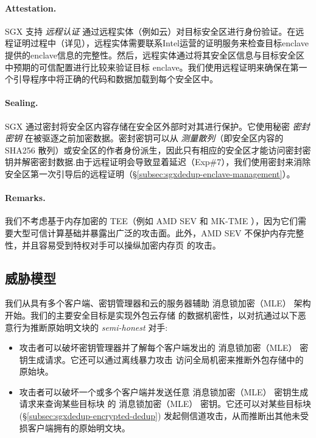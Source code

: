 \paragraph*{Attestation.} SGX 支持 \textit{ 远程认证} 通过远程实体（例如云）对目标安全区进行身份验证。在远程证明过程中（详见\cite{sgx}），远程实体需要联系Intel运营的证明服务来检查目标enclave提供的enclave信息的完整性。然后，远程实体通过将其安全区信息与目标安全区中预期的可信配置进行比较来验证目标 enclave。我们使用远程证明来确保在第一个引导程序中将正确的代码和数据加载到每个安全区中。

\paragraph*{Sealing.} SGX 通过密封将安全区内容存储在安全区外部时对其进行保护。它使用秘密 \textit{ 密封密钥} 在被驱逐之前加密数据。密封密钥可以从 \textit{ 测量散列}（即安全区内容的 SHA256 散列）或安全区的作者身份派生，因此只有相应的安全区才能访问密封密钥并解密密封数据.由于远程证明会导致显着延迟（Exp\#7），我们使用密封来消除安全区第一次引导后的远程证明（\S\ref{subsec:sgxdedup-enclave-management}）。

\paragraph*{Remarks.} 我们不考虑基于内存加密的 TEE（例如 AMD SEV \cite{Amdsev} 和 MK-TME \cite{Mktem}），因为它们需要大型可信计算基础并暴露出广泛的攻击面\cite{mofrad18}。此外，AMD SEV \cite{Amdsev} 不保护内存完整性，并且容易受到特权对手可以操纵加密内存页 \cite{mofrad18} 的攻击。

\subsection{威胁模型}
\label{subsec:sgxdedup-threat}

 我们从具有多个客户端、密钥管理器和云的服务器辅助 消息锁加密（MLE） 架构 \cite{bellare13b} 开始。我们的主要安全目标是实现外包云存储 \cite{bellare13b} 的数据机密性，以对抗通过以下恶意行为推断原始明文块的 \textit{ semi-honest} 对手:

\begin{itemize}[leftmargin=*]
\item 攻击者可以破坏密钥管理器并了解每个客户端发出的 消息锁加密（MLE） 密钥生成请求。它还可以通过离线暴力攻击 \cite{bellare13b} 访问全局机密来推断外包存储中的原始块。
    \item 攻击者可以破坏一个或多个客户端并发送任意 消息锁加密（MLE） 密钥生成请求来查询某些目标块 \cite{bellare13b} 的 消息锁加密（MLE） 密钥。它还可以对某些目标块 \cite{harnik10} (\S\ref{subsec:sgxdedup-encrypted-dedup}) 发起侧信道攻击，从而推断出其他未受损客户端拥有的原始明文块。
\end{itemize}

